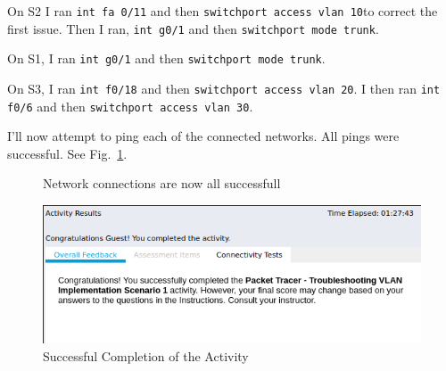 \documentclass[../EngineeringJournal_CDavis.tex]{subfiles}
\begin{document}

On S2 I ran {\scriptsize{\verb$int fa 0/11$}\normalsize} and then
{\scriptsize{\verb$switchport access vlan 10$}\normalsize}to correct the first
issue.
Then I ran, {\scriptsize{\verb$int g0/1$}\normalsize} and then
{\scriptsize{\verb$switchport mode trunk$}\normalsize}. 

On S1, I ran {\scriptsize{\verb$int g0/1$}\normalsize} and then
{\scriptsize{\verb$switchport mode trunk$}\normalsize}.

On S3, I ran {\scriptsize{\verb$int f0/18$}\normalsize} and then
{\scriptsize{\verb$switchport access vlan 20$}\normalsize}.
I then ran {\scriptsize{\verb$int f0/6$}\normalsize} and then
{\scriptsize{\verb$switchport access vlan 30$}\normalsize}.

I'll now attempt to ping each of the connected networks.
All pings were successful. See Fig.~\ref{Success11}.


\begin{figure}[!hbt]\centering
{}\par
{}\hfill
{}\par
\caption{Network connections are now all successfull}
\label{Success11}
\end{figure}



\begin{figure}[!hbt]\centering
\includegraphics[width=.45\linewidth]{Figures/2020-03-08-075242_571x209_scrot.png}
\caption{Successful Completion of the Activity}
\label{Complete11}
\end{figure}

\end{document}
